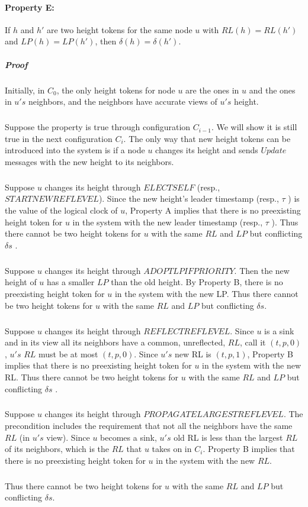 \paragraph{Property E:}If $h$ and $h'$ are two height tokens for the same node $u$ with $RL(h) = RL(h')$ and $LP(h) = LP(h')$, then $\delta (h) = \delta (h' )$.
\subparagraph{Proof}Initially, in $C_0$, the only height tokens for node $u$ are the ones in $u$ and the ones in $u's$ neighbors, and the neighbors have accurate views of $u's$ height.
\subparagraph{}Suppose the property is true through configuration $C_{i-1}$. We will show it is still true in the next configuration $C_i$. The only way that new height tokens can be introduced into the system is if a node $u$ changes its height and sends $Update$ messages with the new height to its neighbors.
\subparagraph{}Suppose $u$ changes its height through $ELECTSELF$ (resp., $STARTNEWREFLEVEL$). Since the new height's leader timestamp (resp., $\tau$ ) is the value of the logical clock of $u$, Property A implies that there is no preexisting height token for $u$ in the system with the new leader timestamp (resp., $\tau$ ). Thus there cannot be two height tokens for $u$ with the same $RL$ and $LP$ but conflicting $\delta s$ .
\subparagraph{}Suppose $u$ changes its height through $ADOPTLPIFPRIORITY$. Then the new height of $u$ has a smaller $LP$ than the old height. By Property B, there is no preexisting height token for $u$ in the system with the new LP. Thus there cannot be two height tokens for $u$ with the same $RL$ and $LP$ but conflicting $\delta s$.
\subparagraph{}Suppose $u$ changes its height through $REFLECTREFLEVEL$. Since $u$ is a sink and in its view all its neighbors have a common, unreflected, $RL$, call it $(t, p, 0)$, $u's$ $RL$ must be at most $(t, p, 0)$. Since $u's$ new RL is $(t, p, 1)$, Property B implies that there is no preexisting height token for $u$ in the system with the new RL. Thus there cannot be two height tokens for $u$ with the same $RL$ and $LP$ but conflicting $\delta s$ . 
\subparagraph{}Suppose $u$ changes its height through $PROPAGATELARGESTREFLEVEL$. The precondition includes the requirement that not all the neighbors have the same $RL$ (in $u's$ view). Since $u$ becomes a sink, $u's$ old RL is less than the largest $RL$ of its neighbors, which is the $RL$ that $u$ takes on in $C_i$. Property B implies that there is no preexisting height token for $u$ in the system with the new $RL$. 
\subparagraph{}Thus there cannot be two height tokens for $u$ with the same $RL$ and $LP$ but conflicting $\delta s$.

